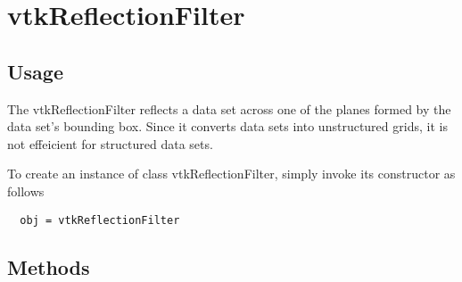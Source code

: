 \section{vtkReflectionFilter}

\subsection{Usage}

 The vtkReflectionFilter reflects a data set across one of the
 planes formed by the data set's bounding box.
 Since it converts data sets into unstructured grids, it is not effeicient
 for structured data sets.

To create an instance of class vtkReflectionFilter, simply
invoke its constructor as follows
\begin{verbatim}
  obj = vtkReflectionFilter
\end{verbatim}
\subsection{Methods}

